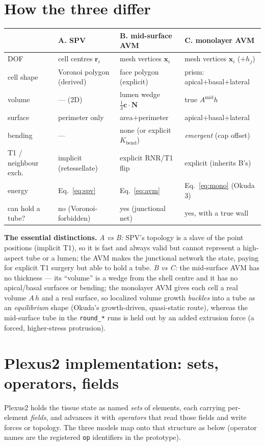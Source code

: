 \documentclass[11pt]{article}
\begin{document}
\section{How the three differ}
\begin{center}\small
\begin{tabular}{@{}llll@{}}
\toprule
 & \textbf{A. SPV} & \textbf{B. mid-surface AVM} & \textbf{C. monolayer AVM} \\
\midrule
DOF & cell centres $\mathbf{r}_i$ & mesh vertices $\mathbf{x}_i$ & mesh vertices $\mathbf{x}_i$ ($+h_j$) \\
cell shape & Voronoi polygon (derived) & face polygon (explicit) & prism: apical+basal+lateral \\
volume & --- (2D) & lumen wedge $\tfrac13\mathbf{c}\!\cdot\!\mathbf{N}$ & true $A^{\text{mid}}h$ \\
surface & perimeter only & area+perimeter & apical+basal+lateral \\
bending & --- & none (or explicit $K_{\text{bend}}$) & \emph{emergent} (cap offset) \\
T1 / neighbour exch. & implicit (retessellate) & explicit RNR/T1 flip & explicit (inherits B's) \\
energy & Eq.~\ref{eq:spv} & Eq.~\ref{eq:avm} & Eq.~\ref{eq:mono} (Okuda 3) \\
can hold a tube? & no (Voronoi-forbidden) & yes (junctional net) & yes, with a true wall \\
\bottomrule
\end{tabular}
\end{center}

\noindent\textbf{The essential distinctions.}
\emph{A vs B:} SPV's topology is a slave of the point positions (implicit T1), so it is fast and always valid
but cannot represent a high-aspect tube or a lumen; the AVM makes the junctional network the state, paying
for explicit T1 surgery but able to hold a tube. \emph{B vs C:} the mid-surface AVM has no thickness --- its
``volume'' is a wedge from the shell centre and it has no apical/basal surfaces or bending; the monolayer AVM
gives each cell a real volume $A\,h$ and a real surface, so localized volume growth \emph{buckles} into a
tube as an \emph{equilibrium} shape (Okuda's growth-driven, quasi-static route), whereas the mid-surface tube
in the \texttt{round\_*} runs is held out by an added extrusion force (a forced, higher-stress protrusion).

\section{Plexus2 implementation: sets, operators, fields}
Plexus2 holds the tissue state as named \emph{sets} of elements, each carrying per-element \emph{fields}, and
advances it with \emph{operators} that read those fields and write forces or topology. The three models map
onto that structure as below (operator names are the registered \texttt{op} identifiers in the prototype).
\end{document}
